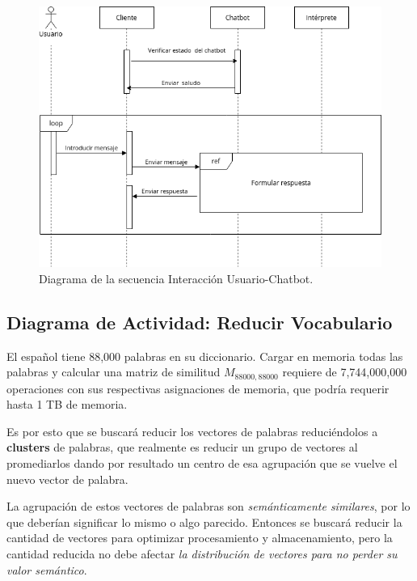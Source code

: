 \begin{figure}[ht]
    \centering
    \includegraphics[scale=0.7]{images/5/diagrama-secuencia.png}
    \caption{Diagrama de la secuencia Interacción Usuario-Chatbot.}
    \label{fig:secuencia-general}
\end{figure}

\newpage

\subsection{Diagrama de Actividad: Reducir Vocabulario}
\label{subsec:reduccion-vocabulario}

El español tiene 88,000 palabras en su diccionario. Cargar en memoria todas las palabras y calcular una matriz de similitud $M_{88000,88000}$ requiere de 7,744,000,000 operaciones con sus respectivas asignaciones de memoria, que podría requerir hasta 1 TB de memoria.

Es por esto que se buscará reducir los vectores de palabras reduciéndolos a \textbf{clusters} de palabras, que realmente es reducir un grupo de vectores al promediarlos dando por resultado un centro de esa agrupación que se vuelve el nuevo vector de palabra.

La agrupación de estos vectores de palabras son \textit{semánticamente similares}, por lo que deberían significar lo mismo o algo parecido. Entonces se buscará reducir la cantidad de vectores para optimizar procesamiento y almacenamiento, pero la cantidad reducida no debe afectar \textit{la distribución de vectores para no perder su valor semántico}.

